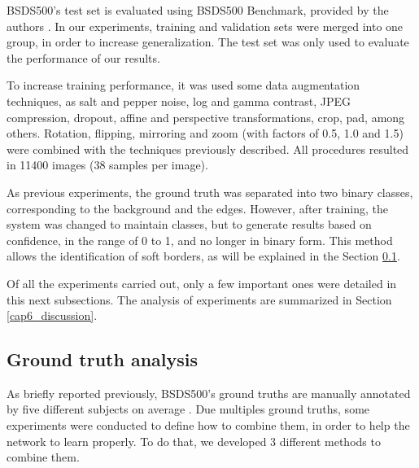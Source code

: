 BSDS500's test set is evaluated using BSDS500 Benchmark, provided by the authors \cite{amfm_pami2011}.
In our experiments, training and validation sets were merged into one group, in order to increase generalization.
The test set was only used to evaluate the performance of our results.

To increase training performance, it was used some data augmentation techniques, as salt and pepper noise, log and gamma contrast, JPEG compression, dropout, affine and perspective transformations, crop, pad, among others.
Rotation, flipping, mirroring and zoom (with factors of 0.5, 1.0 and 1.5) were combined with the techniques previously described.
All procedures resulted in 11400 images (38 samples per image).%

As previous experiments, the ground truth was separated into two binary classes, corresponding to the background and the edges.
However, after training, the system was changed to maintain classes, but to generate results based on confidence, in the range of 0 to 1, and no longer in binary form.
This method allows the identification of soft borders, as will be explained in the Section \ref{ssec:groundtruth_analysis}.%

Of all the experiments carried out, only a few important ones were detailed in this next subsections.
The analysis of experiments are summarized in Section \ref{cap6_discussion}.

\subsection{Ground truth analysis}
\label{ssec:groundtruth_analysis}

As briefly reported previously, BSDS500's ground truths are manually annotated by five different subjects on average \cite{amfm_pami2011}.
Due multiples ground truths, some experiments were conducted to define how to combine them, in order to help the network to learn properly.
To do that, we developed 3 different methods to combine them.

